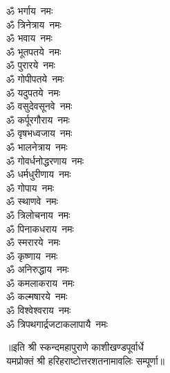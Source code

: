 \begin{multicols}{2}
\begin{flushleft}
ॐ भर्गाय~नमः\\
ॐ त्रिनेत्राय~नमः\\
ॐ भवाय~नमः\\
ॐ भूतपतये~नमः\\
ॐ पुरारये~नमः\\
ॐ गोपीपतये~नमः\hfill{}\\
ॐ यदुपतये~नमः\\
ॐ वसुदेवसूनवे~नमः\\
ॐ कर्पूरगौराय~नमः\\
ॐ वृषभध्वजाय~नमः\\
ॐ भालनेत्राय~नमः\\
ॐ गोवर्धनोद्धरणाय~नमः\\
ॐ धर्मधुरीणाय~नमः\\
ॐ गोपाय~नमः\\
ॐ स्थाणवे~नमः\\
ॐ त्रिलोचनाय~नमः\hfill{}\\
ॐ पिनाकधराय~नमः\\
ॐ स्मरारये~नमः\\
ॐ कृष्णाय~नमः\\
ॐ अनिरुद्धाय~नमः\\
ॐ कमलाकराय~नमः\\
ॐ कल्मषारये~नमः\\
ॐ विश्वेश्वराय~नमः\\
ॐ त्रिपथगार्द्रजटाकलापायै~नमः\\
\end{flushleft}
\end{multicols}
॥इति श्री स्कन्दमहापुराणे काशीखण्डपूर्वार्धे\\यमप्रोक्तं श्री हरिहराष्टोत्तरशतनामावलिः सम्पूर्णा॥
